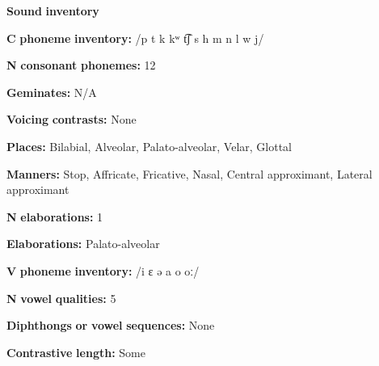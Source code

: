 \begin{styleBody}
\textbf{Sound} \textbf{inventory}
\end{styleBody}

\begin{styleBody}
\textbf{C} \textbf{phoneme} \textbf{inventory:} /p t k kʷ t͡ʃ s h m n l w j/
\end{styleBody}

\begin{styleBody}
\textbf{N} \textbf{consonant} \textbf{phonemes:} 12
\end{styleBody}

\begin{styleBody}
\textbf{Geminates:} N/A
\end{styleBody}

\begin{styleBody}
\textbf{Voicing} \textbf{contrasts:} None
\end{styleBody}

\begin{styleBody}
\textbf{Places:} Bilabial, Alveolar, Palato-alveolar, Velar, Glottal
\end{styleBody}

\begin{styleBody}
\textbf{Manners:} Stop, Affricate, Fricative, Nasal, Central approximant, Lateral approximant
\end{styleBody}

\begin{styleBody}
\textbf{N} \textbf{elaborations:} 1
\end{styleBody}

\begin{styleBody}
\textbf{Elaborations:} Palato-alveolar
\end{styleBody}

\begin{styleBody}
\textbf{V} \textbf{phoneme} \textbf{inventory:} /i ɛ ə a o oː/
\end{styleBody}

\begin{styleBody}
\textbf{N} \textbf{vowel} \textbf{qualities:} 5
\end{styleBody}

\begin{styleBody}
\textbf{Diphthongs} \textbf{or} \textbf{vowel} \textbf{sequences:} None
\end{styleBody}

\begin{styleBody}
\textbf{Contrastive} \textbf{length:} Some
\end{styleBody}

